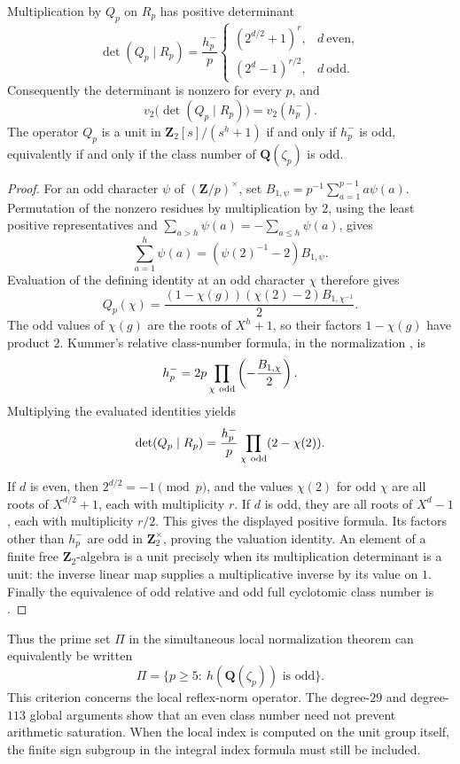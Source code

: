 \begin{proposition}\label{prop:cm-class-number-determinant}
Multiplication by \(Q_p\) on \(R_p\) has positive determinant
\[
 \det(Q_p\mid R_p)=\frac{h_p^-}{p}
 \begin{cases}
 (2^{d/2}+1)^r,&d\ \text{even},\\
 (2^d-1)^{r/2},&d\ \text{odd}.
 \end{cases}
\]
Consequently the determinant is nonzero for every \(p\), and
\[
 v_2\bigl(\det(Q_p\mid R_p)\bigr)=v_2(h_p^-).
\]
The operator \(Q_p\) is a unit in
\(\mathbf Z_2[s]/(s^h+1)\) if and only if \(h_p^-\) is odd,
equivalently if and only if the class number of
\(\mathbf Q(\zeta_p)\) is odd.
\end{proposition}
\begin{proof}
For an odd character \(\psi\) of
\((\mathbf Z/p)^\times\), set
\(B_{1,\psi}=p^{-1}\sum_{a=1}^{p-1}a\psi(a)\).
Permutation of the nonzero residues by multiplication by \(2\),
using the least positive representatives and
\(\sum_{a>h}\psi(a)=-\sum_{a\leq h}\psi(a)\), gives
\[
 \sum_{a=1}^{h}\psi(a)
       =(\psi(2)^{-1}-2)B_{1,\psi}.
\]
Evaluation of the defining identity at an odd character \(\chi\)
therefore gives
\[
 Q_p(\chi)=
 \frac{(1-\chi(g))(\chi(2)-2)B_{1,\chi^{-1}}}{2}.
\]
The odd values of \(\chi(g)\) are the roots of \(X^h+1\), so
their factors \(1-\chi(g)\) have product \(2\).  Kummer's
relative class-number formula, in the normalization
\cite[Eq.~(1.2), p.~1]{Agoh2012}, is
\[
 h_p^-=2p\prod_{\chi\ {\rm odd}}\left(-\frac{B_{1,\chi}}2\right).
\]
Multiplying the evaluated identities yields
\[
 \det(Q_p\mid R_p)
     =\frac{h_p^-}{p}\prod_{\chi\ {\rm odd}}(2-\chi(2)).
\]

If \(d\) is even, then \(2^{d/2}=-1\pmod p\), and the values
\(\chi(2)\) for odd \(\chi\) are all roots of \(X^{d/2}+1\),
each with multiplicity \(r\).  If \(d\) is odd, they are all
roots of \(X^d-1\), each with multiplicity \(r/2\).  This gives
the displayed positive formula.  Its factors other than
\(h_p^-\) are odd in \(\mathbf Z_2^\times\), proving the valuation
identity.  An element of a finite free \(\mathbf Z_2\)-algebra
is a unit precisely when its multiplication determinant is
a unit: the inverse linear map supplies a multiplicative inverse
by its value on \(1\).  Finally the equivalence of odd relative
and odd full cyclotomic class number is
\cite[Proposition~1, equivalence (1)--(2), p.~207]{Dummit2020}.
\end{proof}

Thus the prime set \(\Pi\) in the simultaneous local
normalization theorem can equivalently be written
\[
 \Pi=\{p\geq5:\ h(\mathbf Q(\zeta_p))\text{ is odd}\}.
\]
This criterion concerns the local reflex-norm operator.
The degree-\(29\) and degree-\(113\) global arguments show that
an even class number need not prevent arithmetic saturation.
When the local index is computed on the unit group itself,
the finite sign subgroup in the integral index formula must
still be included.
